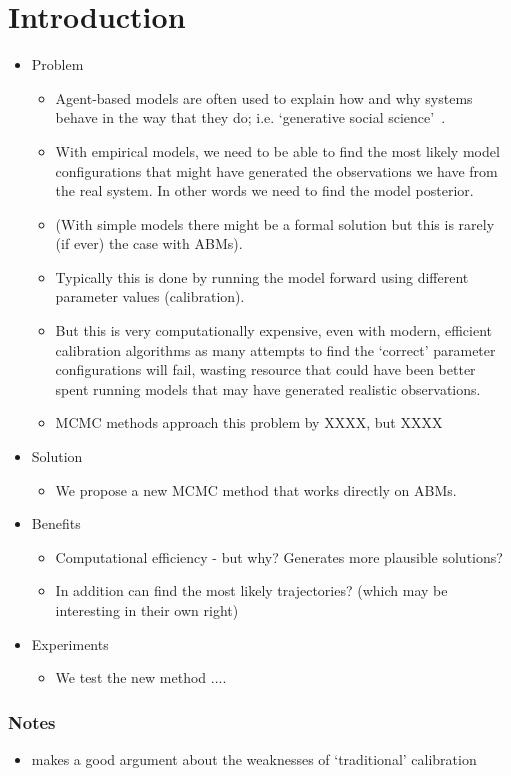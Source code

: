 \section{Introduction}

\begin{itemize}
	\item Problem
	\begin{itemize}
		\item Agent-based models are often used to explain how and why systems behave in the way that they do; i.e. `generative social science'~\cite{epstein_agentbased_1999}.
		\item With empirical models, we need to be able to find the most likely model configurations that might have generated the observations we have from the real system. In other words we need to find the model posterior. 
		\item (With simple models there might be a formal solution but this is rarely (if ever) the case with ABMs).
		\item Typically this is done by running the model forward using different parameter values (calibration).
		\item But this is very computationally expensive, even with modern, efficient calibration algorithms \cite{thiele_facilitating_2014} as many attempts to find the `correct' parameter configurations will fail, wasting resource that could have been better spent running models that may have generated realistic observations.
		\item MCMC methods approach this problem by XXXX, but XXXX
	\end{itemize}
	\item Solution
	\begin{itemize}
		\item We propose a new MCMC method that works directly on ABMs.
	\end{itemize}
	\item Benefits 
	\begin{itemize}
		\item Computational efficiency - but why? Generates more plausible solutions?
		\item In addition can find the most likely trajectories? (which may be interesting in their own right)
	\end{itemize}
	\item Experiments
	\begin{itemize}
		\item We test the new method .... 
	\end{itemize}
\end{itemize}

\subsubsection*{Notes}

\begin{itemize}
	\item \cite{kennedy_bayesian_2001} makes a good argument about the weaknesses of `traditional' calibration
\end{itemize}

